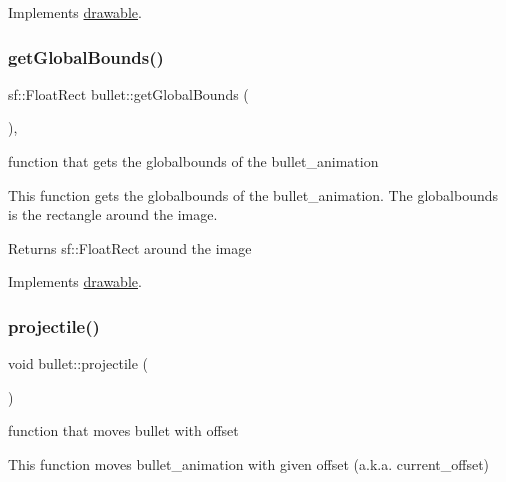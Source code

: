 Implements \hyperlink{classdrawable_a4e49e2c1121704c83ce24c5f48dd910f}{drawable}.

\mbox{\label{classbullet_a87bda5887249e8e37c5579180449bd93}} 
\subsubsection{\texorpdfstring{get\+Global\+Bounds()}{getGlobalBounds()}}
{\footnotesize\ttfamily sf\+::\+Float\+Rect bullet\+::get\+Global\+Bounds (\begin{DoxyParamCaption}{ }\end{DoxyParamCaption})\hspace{0.3cm}{\ttfamily [override]}, {\ttfamily [virtual]}}



function that gets the globalbounds of the bullet\+\_\+animation 

This function gets the globalbounds of the bullet\+\_\+animation. The globalbounds is the rectangle around the image.

\begin{DoxyReturn}{Returns}
sf\+::\+Float\+Rect around the image 
\end{DoxyReturn}


Implements \hyperlink{classdrawable_ae013ac0be47538be9ce885d6642daf73}{drawable}.

\mbox{\label{classbullet_a1f2cd5b7fa4d4beae1d27c06bc54f8c0}} 
\subsubsection{\texorpdfstring{projectile()}{projectile()}}
{\footnotesize\ttfamily void bullet\+::projectile (\begin{DoxyParamCaption}{ }\end{DoxyParamCaption})\hspace{0.3cm}{\ttfamily [private]}}



function that moves bullet with offset 

This function moves bullet\+\_\+animation with given offset (a.\+k.\+a. current\+\_\+offset) \mbox{\label{classbullet_af338da31bfb1dd4b2d942ca67316350a}} 
